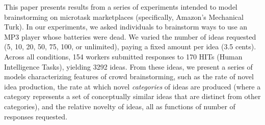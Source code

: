 


This paper presents results from a series of experiments intended to model brainstorming on microtask marketplaces (specifically, Amazon's Mechanical Turk). In our experiments, we asked individuals to brainstorm ways to use an MP3 player whose batteries were dead. We varied the number of ideas requested (5, 10, 20, 50, 75, 100, or unlimited), paying a fixed amount per idea (3.5 cents). Across all conditions, 154 workers submitted responses to 170 HITs (Human Intelligence Tasks), yielding 3292 ideas. From these ideas, we present a series of models characterizing features of crowd brainstorming, such as the rate of novel idea production, the rate at which novel {\em categories\/} of ideas are produced (where a category represents a set of conceptually similar ideas that are distinct from other categories), and the relative novelty of ideas, all as functions of number of responses requested.

